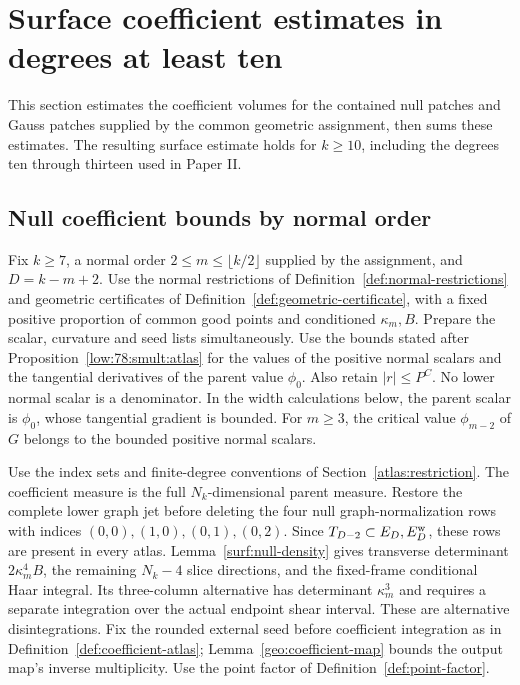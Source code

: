 \documentclass[11pt]{amsart}
\theoremstyle{definition}
\theoremstyle{remark}
\numberwithin{equation}{section}
\begin{document}
\section{Surface coefficient estimates in degrees at least ten}\label{surf:section}

This section estimates the coefficient volumes for the contained null patches and Gauss patches supplied by the common geometric assignment, then sums these estimates. The resulting surface estimate holds for $k\ge10$, including the degrees ten through thirteen used in Paper II.

\subsection{Null coefficient bounds by normal order}\label{surf:null-counts}

Fix $k\ge7$, a normal order $2\le m\le\lfloor k/2\rfloor$ supplied by the assignment, and $D=k-m+2$. Use the normal restrictions of Definition~\ref{def:normal-restrictions} and geometric certificates of Definition~\ref{def:geometric-certificate}, with a fixed positive proportion of common good points and conditioned $\kappa_m,B$. Prepare the scalar, curvature and seed lists simultaneously. Use the bounds stated after Proposition~\ref{low:78:smult:atlas} for the values of the positive normal scalars and the tangential derivatives of the parent value $\phi_0$. Also retain $|r|\le P^C$. No lower normal scalar is a denominator. In the width calculations below, the parent scalar is $\phi_0$, whose tangential gradient is bounded. For $m\ge3$, the critical value $\phi_{m-2}$ of $G$ belongs to the bounded positive normal scalars.

Use the index sets and finite-degree conventions of Section~\ref{atlas:restriction}. The coefficient measure is the full $N_k$-dimensional parent measure. Restore the complete lower graph jet before deleting the four null graph-normalization rows with indices $(0,0),(1,0),(0,1),(0,2)$. Since $T_{D-2}\subset E_D,E_D^{\rm w}$, these rows are present in every atlas. Lemma~\ref{surf:null-density} gives transverse determinant $2\kappa_m^4B$, the remaining $N_k-4$ slice directions, and the fixed-frame conditional Haar integral. Its three-column alternative has determinant $\kappa_m^3$ and requires a separate integration over the actual endpoint shear interval. These are alternative disintegrations. Fix the rounded external seed before coefficient integration as in Definition~\ref{def:coefficient-atlas}; Lemma~\ref{geo:coefficient-map} bounds the output map's inverse multiplicity. Use the point factor of Definition~\ref{def:point-factor}.
\end{document}
